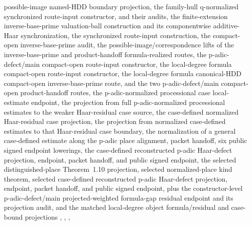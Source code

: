 \begin{proposition}
  possible-image named-HDD boundary projection, the family-hull q-normalized
  synchronized route-input constructor, and their audits, the finite-extension
  inverse-base-prime valuation-ball construction and its componentwise
  additive-Haar synchronization, the synchronized route-input construction, the
  compact-open inverse-base-prime audit, the possible-image/correspondence
  lifts of the inverse-base-prime and product-handoff formula-realized routes,
  the p-adic-defect/main compact-open
  route-input constructor, the local-degree formula compact-open route-input
  constructor, the local-degree formula canonical-HDD compact-open
  inverse-base-prime route, and the two p-adic-defect/main compact-open
  product-handoff routes, the p-adic-normalized processional case
  local-estimate endpoint, the projection from full p-adic-normalized
  processional estimates to the weaker Haar-residual case source, the
  case-defined normalized Haar-residual case projection, the projection from
  normalized case-defined estimates to that Haar-residual case boundary, the
  normalization of a general case-defined estimate along the p-adic place
  alignment, packet handoff, six public signed endpoint lowerings, the
  case-defined reconstructed p-adic Haar-defect projection, endpoint, packet
  handoff, and public signed endpoint, the selected distinguished-place
  Theorem~1.10 projection, selected normalized-place kind theorem, selected
  case-defined reconstructed p-adic Haar-defect projection, endpoint, packet
  handoff, and public signed endpoint, plus the
  constructor-level p-adic-defect/main
  projected-weighted formula-gap residual endpoint and its projection audit,
  and the matched local-degree object formula/residual and case-bound
  projections
  ,
  ,
  ,

\end{proposition}
